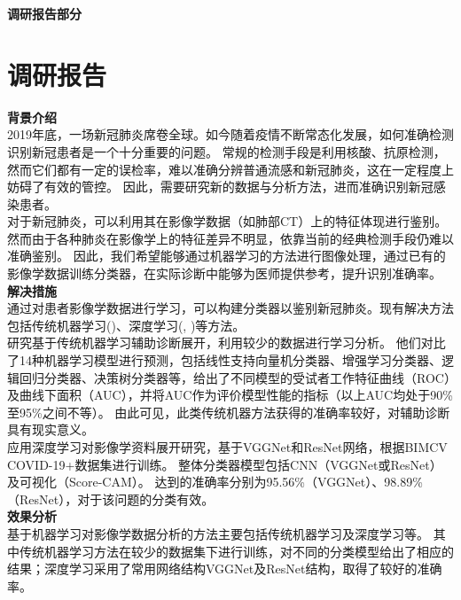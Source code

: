 \documentclass[a4paper]{article}
\begin{document}
\courseheader{}
\vspace{3mm}
\centerline{\textbf{\Large{调研报告部分}}}
\vspace{3mm}

\section{调研报告}

\textbf{背景介绍}\\
\hspace{2em}2019年底，一场新冠肺炎席卷全球。如今随着疫情不断常态化发展，如何准确检测识别新冠患者是一个十分重要的问题。
常规的检测手段是利用核酸、抗原检测，然而它们都有一定的误检率，难以准确分辨普通流感和新冠肺炎，这在一定程度上妨碍了有效的管控。
因此，需要研究新的数据与分析方法，进而准确识别新冠感染患者。\\
\hspace{2em}对于新冠肺炎，可以利用其在影像学数据（如肺部CT）上的特征体现进行鉴别。然而由于各种肺炎在影像学上的特征差异不明显，依靠当前的经典检测手段仍难以准确鉴别。
因此，我们希望能够通过机器学习的方法进行图像处理，通过已有的影像学数据训练分类器，在实际诊断中能够为医师提供参考，提升识别准确率。\\

\textbf{解决措施}\\
\hspace{2em}通过对患者影像学数据进行学习，可以构建分类器以鉴别新冠肺炎。现有解决方法包括传统机器学习(\cite{tianbin})、深度学习(\cite{xucuilian}, \cite{zouwenwen})等方法。\\
\hspace{2em}\cite{tianbin} 研究基于传统机器学习辅助诊断展开，利用较少的数据进行学习分析。
他们对比了14种机器学习模型进行预测，包括线性支持向量机分类器、增强学习分类器、逻辑回归分类器、决策树分类器等，给出了不同模型的受试者工作特征曲线（ROC）及曲线下面积（AUC），并将AUC作为评价模型性能的指标（以上AUC均处于90\%至95\%之间不等）。
由此可见，此类传统机器方法获得的准确率较好，对辅助诊断具有现实意义。\\
\hspace{2em}\cite{zouwenwen} 应用深度学习对影像学资料展开研究，基于VGGNet和ResNet网络，根据BIMCV COVID-19+数据集进行训练。
整体分类器模型包括CNN（VGGNet或ResNet）及可视化（Score-CAM）。
达到的准确率分别为95.56\%（VGGNet）、98.89\%（ResNet），对于该问题的分类有效。\\

\textbf{效果分析}\\
\hspace{2em}基于机器学习对影像学数据分析的方法主要包括传统机器学习及深度学习等。
其中传统机器学习方法在较少的数据集下进行训练，对不同的分类模型给出了相应的结果；深度学习采用了常用网络结构VGGNet及ResNet结构，取得了较好的准确率。\\
\end{document}
